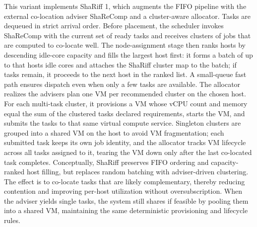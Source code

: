 This variant implements ShaRiff 1, which augments the FIFO pipeline with the external co-location adviser ShaReComp and a cluster-aware allocator. Tasks are dequeued in strict arrival order. Before placement, the scheduler invokes ShaReComp with the current set of ready tasks and receives clusters of jobs that are computed to co-locate well. The node-assignment stage then ranks hosts by descending idle-core capacity and fills the largest host first: it forms a batch of up to that hosts idle cores and attaches the ShaRiff cluster map to the batch; if tasks remain, it proceeds to the next host in the ranked list. A small-queue fast path ensures dispatch even when only a few tasks are available.
The allocator realizes the advisers plan one VM per recommended cluster on the chosen host. For each multi-task cluster, it provisions a VM whose vCPU count and memory equal the sum of the clustered tasks declared requirements, starts the VM, and submits the tasks to that same virtual compute service. Singleton clusters are grouped into a shared VM on the host to avoid VM fragmentation; each submitted task keeps its own job identity, and the allocator tracks VM lifecycle across all tasks assigned to it, tearing the VM down only after the last co-located task completes.
Conceptually, ShaRiff preserves FIFO ordering and capacity-ranked host filling, but replaces random batching with adviser-driven clustering. The effect is to co-locate tasks that are likely complementary, thereby reducing contention and improving per-host utilization without oversubscription. When the adviser yields single tasks, the system still shares if feasible by pooling them into a shared VM, maintaining the same deterministic provisioning and lifecycle rules.


